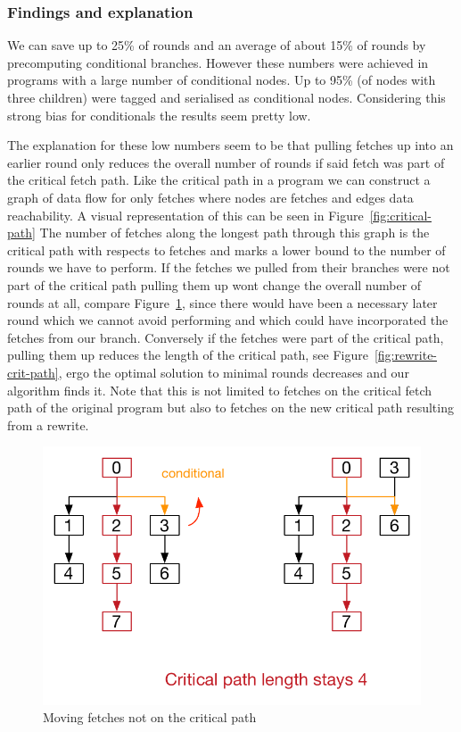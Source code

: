 \subsubsection{Findings and explanation}

We can save up to 25\% of rounds and an average of about 15\% of rounds by precomputing conditional branches.
However these numbers were achieved in programs with a large number of conditional nodes.
Up to 95\% (of nodes with three children) were tagged and serialised as conditional nodes.
Considering this strong bias for conditionals the results seem pretty low.

The explanation for these low numbers seem to be that pulling fetches up into an earlier round only reduces the overall number of rounds if said fetch was part of the critical fetch path.
Like the critical path in a program we can construct a graph of data flow for only fetches where nodes are fetches and edges data reachability.
A visual representation of this can be seen in Figure~\ref{fig:critical-path}
The number of fetches along the longest path through this graph is the critical path with respects to fetches and marks a lower bound to the number of rounds we have to perform.
If the fetches we pulled from their branches were not part of the critical path pulling them up wont change the overall number of rounds at all, compare Figure~\ref{fig:rewrite-not-crit-path}, since there would have been a necessary later round which we cannot avoid performing and which could have incorporated the fetches from our branch.
Conversely if the fetches were part of the critical path, pulling them up reduces the length of the critical path, see Figure~\ref{fig:rewrite-crit-path}, ergo the optimal solution to minimal rounds decreases and our algorithm finds it.
Note that this is not limited to fetches on the critical fetch path of the original program but also to fetches on the new critical path resulting from a rewrite.

\begin{figure}
  \includegraphics[width=\textwidth]{../Figures/rewrite-not-crit-path}
  \caption{Moving fetches not on the critical path}
  \label{fig:rewrite-not-crit-path}
\end{figure}

